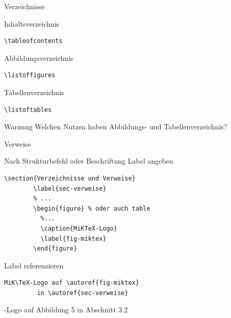 \begin{Frame}[fragile]{Verzeichnisse}
  \begin{Block}{Inhaltsverzeichnis}
    \begin{lstlisting}[gobble=6,style=block]
      \tableofcontents
    \end{lstlisting}
  \end{Block}

  \begin{Block}{Abbildungsverzeichnis}
    \begin{lstlisting}[gobble=6,style=block]
      \listoffigures
    \end{lstlisting}
  \end{Block}

  \begin{Block}{Tabellenverzeichnis}
    \begin{lstlisting}[gobble=6,style=block]
      \listoftables
    \end{lstlisting}
  \end{Block}

  \xxx

  \begin{alertblock}{Warnung}
    Welchen Nutzen haben Abbildungs- und Tabellenverzeichnis?
  \end{alertblock}
\end{Frame}

\begin{Frame}[fragile]{Verweise}
  \begin{looseitemize}
    \item \alert{Nach} Strukturbefehl oder Beschriftung Label angeben
      \begin{lstlisting}[gobble=8]
        \section{Verzeichnisse und Verweise}
        \label{sec-verweise}
        % ...
        \begin{figure} % oder auch table
          %...
          \caption{MiKTeX-Logo}
          \label{fig-miktex}
        \end{figure}
      \end{lstlisting}
     \item Label referenzieren
       \begin{lstlisting}[gobble=8]
         MiK\TeX-Logo auf \autoref{fig-miktex}
         in \autoref{sec-verweise}
       \end{lstlisting}
       \MiKTeX-Logo auf Abbildung 5 in Abschnitt 3.2
  \end{looseitemize}
\end{Frame}


